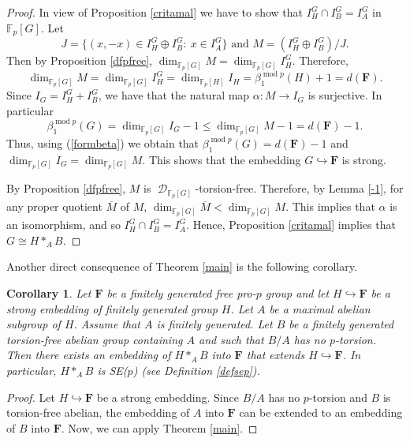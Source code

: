 \documentclass[11pt]{amsart}
\newtheorem{cor}[lem]{Corollary}
\numberwithin{claimcounter}{lem}
\DeclareMathOperator{\D}{\mathcal D}
\newcommand{\F}{\mathbb{F}}
\begin{document}
\begin{proof} 
In view of Proposition \ref{critamal} we have to show that $I^G_H\cap I_B^G=I_A^G$ in $\F_p[G]$. Let 
$$J=\{(x,-x)\in I^G_H\oplus I^G_B:\ x\in I^G_A\} \textrm{\ and\ } M=(I^G_H\oplus I^G_B)/J.$$ Then  by Proposition \ref{dfpfree}, $\dim_{\F_p[G]}M=\dim_{\F_p[G]}I^G_H$. Therefore, 
 $$\dim_{\F_p[G]}M=\dim_{\F_p[G]}I^G_H=\dim_{\F_p[H]} I_H=\beta_1^{\operatorname{mod}p} (H)+1=d(\mathbf F).$$
Since $I_G=I_H^G+I_B^G$,  we have that the natural map $\alpha: M\to I_G$ is surjective. In particular $$\beta^{\operatorname{mod}p}_1(G)=\dim_{\F_p[G]}I_G-1\le\dim_{\F_p[G]} M-1= d(\mathbf F)-1.$$
Thus, using (\ref{formbeta}) we obtain that $\beta^{\operatorname{mod}p}_1(G)= d(\mathbf F)-1$ and $\dim_{\F_p[G]} I_G=\dim_{\F_p[G]}   M$. This shows that the  embedding $G \hookrightarrow \mathbf F$ is strong. 

By Proposition \ref{dfpfree}, $M$ is $\D_{\F_p[G]}$-torsion-free. Therefore, by Lemma \ref{-1}, for any proper quotient $\overline M$ of $M$, $\dim_{\F_p[G]} \overline M< \dim_{\F_p[G]}   M$. This implies that $\alpha$ is an isomorphism, and so  $I^G_H\cap I_B^G=I_A^G$. Hence, Proposition \ref{critamal} implies that  $G\cong  H*_AB$.\end{proof}

Another direct consequence  of  Theorem \ref{main} is the following corollary.
\begin{cor}\label{amalg}  Let $\mathbf F$  be a finitely generated free pro-$p$ group and  let $H\hookrightarrow \mathbf F$ be  a strong embedding of finitely generated group  $H$. 
Let $A$ be a maximal abelian subgroup of $H$. Assume that $A$ is finitely generated. Let $B$ be a finitely generated torsion-free abelian group containing $A$  and such that   $B/A$ has no $p$-torsion. Then there exists an embedding of 
$H*_AB$ into $\mathbf F$ that extends  $H\hookrightarrow \mathbf F$. In particular, $ H*_AB$ is SE($p$) (see Definition \ref{defsep}).
\end{cor}
\begin{proof} Let $H\hookrightarrow \mathbf F$ be  a strong embedding.
 Since $B/A$ has no $p$-torsion and  $B$ is torsion-free abelian, the embedding of $A$ into $\mathbf F$ can be extended to an  embedding of $B$ into $\mathbf F$. Now, we can apply Theorem \ref{main}.\end{proof}
\end{document}
